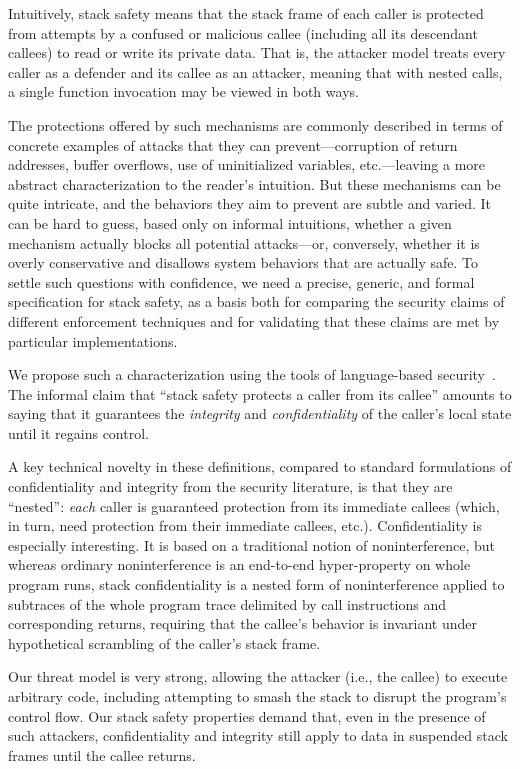 \documentclass[acmsmall,review,anonymous]{acmart}\settopmatter{printfolios=true,printccs=false,printacmref=false}
\begin{document}
Intuitively, stack safety means that the stack frame of each caller is protected
from attempts by a confused or malicious callee (including all its
descendant callees) to read or write its private data.
That is, the attacker model treats every caller as a defender and its callee as
an attacker, meaning that with nested calls, a single function invocation
may be viewed in both ways.

The protections offered by such mechanisms are commonly described in terms
of concrete examples of attacks that they can prevent---corruption of return
addresses, buffer overflows, use of uninitialized variables, etc.---leaving
a more abstract characterization to the reader's intuition.  But these
mechanisms can be quite intricate, and the behaviors they aim to prevent are
subtle and varied.  It can be hard to guess, based only on informal
intuitions, whether a given mechanism actually blocks all potential
attacks---or, conversely, whether it is overly conservative and disallows
system behaviors that are actually safe.
To settle such questions with confidence,
we need a precise, generic, and formal specification for stack
safety, as a basis both for comparing the security claims of different
enforcement techniques and for validating that these claims
are met by particular implementations.

We propose such a characterization using the tools of language-based
security~\citep{sabelfeld2003language}. The informal claim that
``stack safety protects a caller
from its callee'' amounts to saying that it guarantees the {\em integrity} and
{\em confidentiality} of the caller’s local state until it regains control.

A key technical novelty in these definitions,
compared to standard formulations of confidentiality and integrity from the
security literature, is that they
are ``nested'': {\em each} caller is guaranteed protection from its
immediate callees (which, in turn, need protection from their immediate
callees, etc.).
Confidentiality is especially interesting. It is based on a traditional
notion of noninterference, but whereas ordinary noninterference
is an end-to-end hyper-property on whole program runs, stack
confidentiality is a nested form of noninterference applied to
subtraces of the whole program trace delimited by call instructions
and corresponding returns, requiring that the callee’s behavior is
invariant under hypothetical scrambling of the caller’s stack frame.

Our threat model is very strong, allowing the attacker (i.e., the
callee) to execute arbitrary code, including attempting to smash
the stack to disrupt the program’s control flow. Our stack safety
properties demand that, even in the presence of such attackers, confidentiality
and integrity still apply to data in suspended stack frames
until the callee returns.
\end{document}
